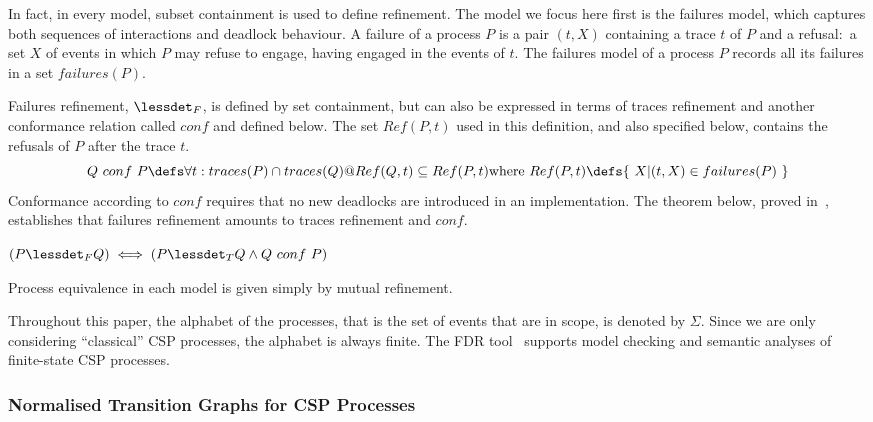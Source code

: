 In fact, in every model, subset containment is used to define refinement. The
model we focus here first is the failures model, which captures both
sequences of interactions and deadlock behaviour. A failure of a process $P$
is a pair $(t,X)$ containing a trace $t$ of $P$ and a refusal:~a set $X$ of
events in which $P$ may refuse to engage, having engaged in the events of
$t$. The failures model of a process $P$ records all its failures in a set
$failures(P)$.

Failures refinement, $\lessdet_F$, is defined by set containment, but can
also be expressed in terms of traces refinement and another conformance
relation called $conf$ and defined below. The set $Ref(P,t)$ used in this
definition, and also specified below, contains the refusals of $P$ after the
trace $t$.
%
\begin{displaymath}
  Q\ conf\ P \defs \forall t: traces(P) \cap traces(Q) @ Ref(Q,t)
  \subseteq Ref(P,t)
  \\ %
  \mbox{where } Ref(P,t) \defs \{~X | (t,X) \in failures(P)~\}
\end{displaymath}
%
Conformance according to $conf$ requires that no new deadlocks are introduced
in an implementation. The theorem below, proved in~\cite{CG07}, establishes
that failures refinement amounts to traces refinement and $conf$.
%
\begin{theorem}
  $(P \lessdet_F Q) \iff (P \lessdet_T Q \land Q\ conf\ P)$
  \label{thm:fref-tref-conf}
\end{theorem}
%
Process equivalence in each model is given simply by mutual refinement.

Throughout this paper, the alphabet of the processes, that is the set of
events that are in scope, is denoted by $\Sigma$. Since we are only
considering ``classical'' CSP processes, the alphabet is always finite. The
FDR tool~\cite{fdr} supports model checking and semantic analyses of
finite-state CSP processes.

\subsubsection*{Normalised Transition Graphs for CSP Processes}
\label{sec:ntg}

